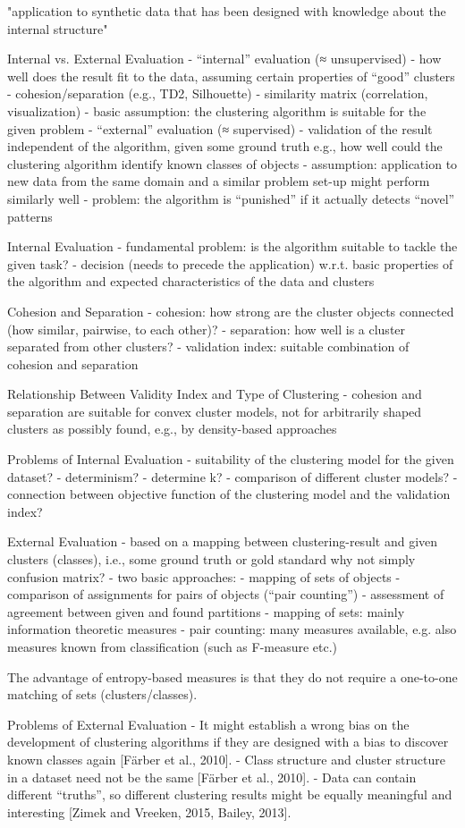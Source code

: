 "application to synthetic data that has been designed with knowledge about the internal structure" \cite{zimek-2024}

Internal vs. External Evaluation
- “internal” evaluation (≈ unsupervised)
   - how well does the result fit to the data, assuming certain properties of “good” clusters
   - cohesion/separation (e.g., TD2, Silhouette)
   - similarity matrix (correlation, visualization)
   - basic assumption: the clustering algorithm is suitable for the given problem
- “external” evaluation (≈ supervised)
   - validation of the result independent of the algorithm, given some ground truth e.g., how well could the clustering algorithm identify known classes of objects
   - assumption: application to new data from the same domain and a similar problem set-up might perform similarly well
   - problem: the algorithm is “punished” if it actually detects “novel” patterns

Internal Evaluation
- fundamental problem: is the algorithm suitable to tackle the given task?
- decision (needs to precede the application) w.r.t. basic properties of the algorithm and expected characteristics of the data and clusters

Cohesion and Separation
- cohesion: how strong are the cluster objects connected (how similar, pairwise, to each other)?
- separation: how well is a cluster separated from other clusters?
- validation index: suitable combination of cohesion and separation

Relationship Between Validity Index and Type of Clustering
- cohesion and separation are suitable for convex cluster models, not for arbitrarily shaped clusters as possibly found, e.g., by density-based approaches

Problems of Internal Evaluation
- suitability of the clustering model for the given dataset? 
- determinism?
- determine k?
- comparison of different cluster models?
- connection between objective function of the clustering model and the validation index?

External Evaluation
- based on a mapping between clustering-result and given clusters (classes), i.e., some ground truth or gold standard why not simply confusion matrix? 
 - two basic approaches:
 - mapping of sets of objects
 - comparison of assignments for pairs of objects (“pair counting”)
- assessment of agreement between given and found partitions
- mapping of sets: mainly information theoretic measures
- pair counting: many measures available, e.g. also measures known from classification (such as F-measure etc.)

The advantage of entropy-based measures is that they do not require a one-to-one matching of sets (clusters/classes).

Problems of External Evaluation
- It might establish a wrong bias on the development of  clustering algorithms if they are designed with a bias to discover known classes again [Färber et al., 2010].
- Class structure and cluster structure in a dataset need not be the same [Färber et al., 2010].
- Data can contain different “truths”, so different clustering results might be equally meaningful and interesting [Zimek and Vreeken, 2015, Bailey, 2013].